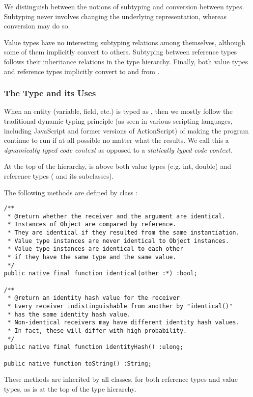 We distinguish between the notions of subtyping and
conversion between types. Subtyping never involves changing the underlying
representation, whereas conversion may do so.

Value types have no interesting subtyping relations among themselves, although
some of them implicitly convert to others. Subtyping between reference types
follows their inheritance relations in the type hierarchy. Finally, both value
types and reference types implicitly convert to and from \code{*}.

\subsubsection{The \code{*} Type and its Uses}
\label{sec:dynamic}

When an entity (variable, field, etc.) is typed as \code{*}, then we mostly
follow the traditional dynamic typing principle (as seen in various scripting
languages, including JavaScript and former versions of
ActionScript\textsuperscript{\textregistered}) of making the program continue to
run if at all possible no matter what the results. We call this a {\em
dynamically typed code context} as opposed to a {\em statically typed code
context}.

At the top of the hierarchy, \code{*} is above both value types
(e.g. int, double) and reference types ( and its
subclasses).

The following methods are defined by class \code{*}:
\begin{verbatim}
/**
 * @return whether the receiver and the argument are identical.
 * Instances of Object are compared by reference.
 * They are identical if they resulted from the same instantiation.
 * Value type instances are never identical to Object instances.
 * Value type instances are identical to each other
 * if they have the same type and the same value.
 */
public native final function identical(other :*) :bool;

/**
 * @return an identity hash value for the receiver
 * Every receiver indistinguishable from another by "identical()"
 * has the same identity hash value.
 * Non-identical receivers may have different identity hash values.
 * In fact, these will differ with high probability.
 */
public native final function identityHash() :ulong;

public native function toString() :String;
\end{verbatim}
These methods are inherited by all classes, for both reference types and value
types, as \code{*} is at the top of the type hierarchy.

